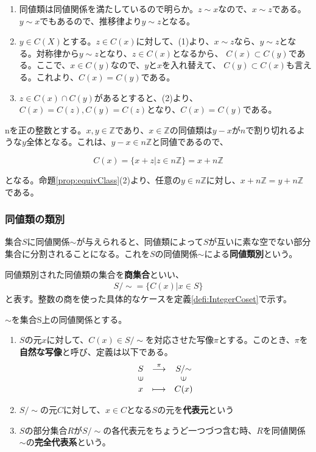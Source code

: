 \documentclass[dvipdfmx,autodetect-engine]{jsarticle}
\begin{document}
\begin{enumerate}
\renewcommand{\labelenumi}{(\arabic{enumi})}
\item 同値類は同値関係を満たしているので明らか。$z \sim x$なので、$x \sim z$である。$y \sim x$でもあるので、推移律より$y \sim z$となる。

\item $y \in C(X)$とする。$z \in C(x)$に対して、(1)より、$x \sim z$なら、$y \sim z$となる。対称律から$y \sim z$となり、$z \in C(x)$となるから、 $C(x) \subset C(y)$である。ここで、$x \in C(y)$なので、$y$と$x$を入れ替えて、
$C(y) \subset C(x)$も言える。これより、$C(x) = C(y)$である。

\item $z \in C(x) \cap C(y)$があるとすると、(2)より、$C(x) = C(z), C(y) = C(z)$となり、$C(x) = C(y)$である。
\end{enumerate}

\exam nを正の整数とする。$x, y \in \mathbb{Z}$であり、$x \in \mathbb{Z}$の同値類は$y - x$が$n$で割り切れるような$y$全体となる。これは、$y - x \in n\mathbb{Z}$と同値であるので、

$$
C(x) = \{x + z | z \in n\mathbb{Z}\} = x + n\mathbb{Z}
$$

となる。命題\ref{prop:equivClass}(2)より、任意の$y \in n\mathbb{Z}$に対し、$x + n\mathbb{Z} = y + n\mathbb{Z}$である。

\subsubsection{同値類の類別}
集合$S$に同値関係$\sim$が与えられると、同値類によって$S$が互いに素な空でない部分集合に分割されることになる。これを$S$の同値関係$\sim$による{\bf 同値類別}という。

\label{defi:quotientSet}

同値類別された同値類の集合を{\bf 商集合}といい、
\begin{eqnarray*}
S/{\sim}  = \{C(x)| x ∈ S\}
\end{eqnarray*}
と表す。整数の商を使った具体的なケースを定義\ref{defi:IntegerCoset}で示す。

 $\sim$を集合S上の同値関係とする。
\begin{enumerate}
\renewcommand{\labelenumi}{(\arabic{enumi})}
\item $S$の元$x$に対して、$C(x) \in S/{\sim}$を対応させた写像$\pi$とする。このとき、$\pi$を{\bf 自然な写像}と呼び、定義は以下である。
$$
\begin{array}{ccc}
S & \stackrel{\pi}{\longrightarrow} & S/{\sim} \\
\rotatebox{90}{$\in$} & & \rotatebox{90}{$\in$} \\
x & \longmapsto & C(x)
\end{array}
$$

\item $S/{\sim}$の元$C$に対して、$x \in C$となる$S$の元を{\bf 代表元}という

\item $S$の部分集合$R$が$S/{\sim}$の各代表元をちょうど一つづつ含む時、$R$を同値関係$\sim$の{\bf 完全代表系}という。

\end{enumerate}
\end{document}
